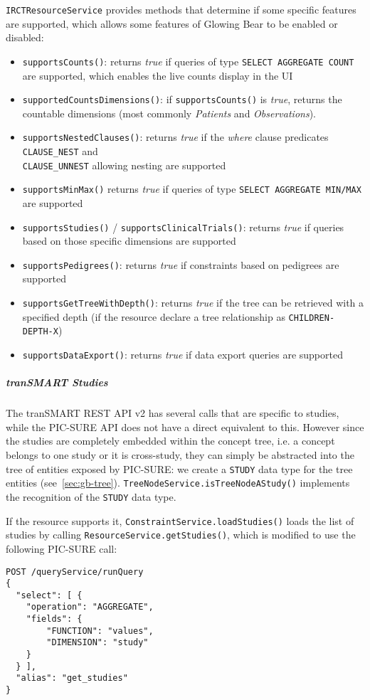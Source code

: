 \verb|IRCTResourceService| provides methods that determine if some specific features are supported, which allows some features of Glowing Bear to be enabled or disabled:
\begin{itemize}
    \item \verb|supportsCounts()|: returns \emph{true} if queries of type \verb|SELECT AGGREGATE COUNT| are supported, which enables the live counts display in the UI
    \item \verb|supportedCountsDimensions()|: if \verb|supportsCounts()| is \emph{true}, returns the countable dimensions (most commonly \emph{Patients} and \emph{Observations}).
    \item \verb|supportsNestedClauses()|: returns \emph{true} if the \emph{where} clause predicates \verb|CLAUSE_NEST| and \\
    \verb|CLAUSE_UNNEST| allowing nesting are supported
    \item \verb|supportsMinMax()| returns \emph{true} if queries of type \verb|SELECT AGGREGATE MIN/MAX| are supported
    \item \verb|supportsStudies()| / \verb|supportsClinicalTrials()|: returns \emph{true} if queries based on those specific dimensions are supported 
    \item \verb|supportsPedigrees()|: returns \emph{true} if constraints based on pedigrees are supported
    \item \verb|supportsGetTreeWithDepth()|: returns \emph{true} if the tree can be retrieved with a specified depth (if the resource declare a tree relationship as \verb|CHILDREN-DEPTH-X|)
    \item \verb|supportsDataExport()|: returns \emph{true} if data export queries are supported
\end{itemize}


\subparagraph{tranSMART Studies}

The tranSMART REST API v2 has several calls that are specific to studies, while the PIC-SURE API does not have a direct equivalent to this.
However since the studies are completely embedded within the concept tree, i.e. a concept belongs to one study or it is cross-study, they can simply be abstracted into the tree of entities exposed by PIC-SURE: we create a \verb|STUDY| data type for the tree entities (see~\ref{sec:gb-tree}).
\verb|TreeNodeService.isTreeNodeAStudy()| implements the recognition of the \verb|STUDY| data type.

If the resource supports it, \verb|ConstraintService.loadStudies()| loads the list of studies by calling \verb|ResourceService.getStudies()|, which is modified to use the following PIC-SURE call:
\begin{verbatim}
POST /queryService/runQuery
{
  "select": [ {
    "operation": "AGGREGATE",
    "fields": {
        "FUNCTION": "values",
        "DIMENSION": "study"
    }
  } ],
  "alias": "get_studies"
}
\end{verbatim}

